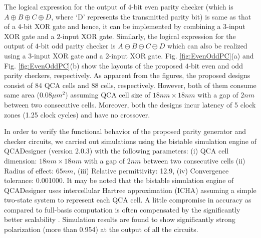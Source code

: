 \documentclass[conference]{IEEEtran}
\begin{document}
The logical expression for the output of $4$-bit even parity checker (which is $A\oplus B\oplus C\oplus D $, where `D' represents the transmitted parity bit) is same as that of a $4$-bit XOR gate and hence, it can be implemented by combining a $3$-input XOR gate and a $2$-input XOR gate.
Similarly, the logical expression for the output of $4$-bit odd parity checker is $A\ominus B\ominus C\ominus D$ which can also be realized using a $3$-input XOR gate and a $2$-input XOR gate.
Fig. \ref{fig:EvenOddPC}(a) and  Fig. \ref{fig:EvenOddPC}(b) show the layouts of the proposed $4$-bit even and odd parity checkers, respectively.
As apparent from the figures, the proposed designs consist of 84 QCA cells and 88 cells, respectively.
However, both of them consume same area ($0.08\mu m^2$) assuming QCA cell size of $18nm \times 18nm$ with a gap of $2nm$ between two consecutive cells.
Moreover, both the designs incur latency of 5 clock zones (1.25 clock cycles) and have no crossover.

In order to verify the functional behavior of the proposed parity generator and checker circuits, we carried out simulations using the bistable simulation engine of QCADesigner \cite{Walus_QCADesigner} (version 2.0.3) with the following parameters:  (i) QCA cell dimension: $18nm \times 18nm$ with a gap of $2nm$ between two consecutive cells (ii) Radius of effect: $65nm$, (iii) Relative permittivity: 12.9, (iv) Convergence tolerance: 0.001000.
It may be noted that the bistable simulation engine of QCADesigner uses intercellular Hartree approximation (ICHA) assuming a simple two-state system to represent each QCA cell. A little compromise in accuracy as compared to full-basis computation is often compensated by the significantly better scalability \cite{LaRue_TNANO2013}.
Simulation results are found to show significantly strong polarization (more than 0.954) at the output of all the circuits. 
\end{document}
